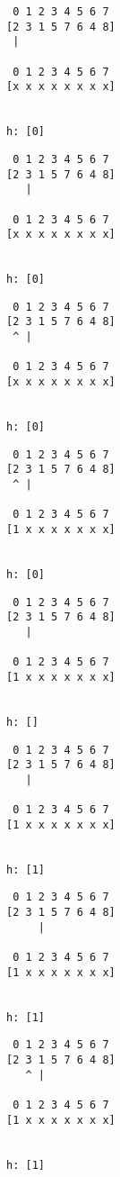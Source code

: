 { \begin{verbatim}
 0 1 2 3 4 5 6 7
[2 3 1 5 7 6 4 8]
 |

 0 1 2 3 4 5 6 7
[x x x x x x x x]


h: [0]
\end{verbatim} }

{ \begin{verbatim}
 0 1 2 3 4 5 6 7
[2 3 1 5 7 6 4 8]
   |

 0 1 2 3 4 5 6 7
[x x x x x x x x]


h: [0]
\end{verbatim} }

{ \begin{verbatim}
 0 1 2 3 4 5 6 7
[2 3 1 5 7 6 4 8]
 ^ |

 0 1 2 3 4 5 6 7
[x x x x x x x x]


h: [0]
\end{verbatim} }

{ \begin{verbatim}
 0 1 2 3 4 5 6 7
[2 3 1 5 7 6 4 8]
 ^ |

 0 1 2 3 4 5 6 7
[1 x x x x x x x]


h: [0]
\end{verbatim} }

{ \begin{verbatim}
 0 1 2 3 4 5 6 7
[2 3 1 5 7 6 4 8]
   |

 0 1 2 3 4 5 6 7
[1 x x x x x x x]


h: []
\end{verbatim} }

{ \begin{verbatim}
 0 1 2 3 4 5 6 7
[2 3 1 5 7 6 4 8]
   |

 0 1 2 3 4 5 6 7
[1 x x x x x x x]


h: [1]
\end{verbatim} }

{ \begin{verbatim}
 0 1 2 3 4 5 6 7
[2 3 1 5 7 6 4 8]
     |

 0 1 2 3 4 5 6 7
[1 x x x x x x x]


h: [1]
\end{verbatim} }

{ \begin{verbatim}
 0 1 2 3 4 5 6 7
[2 3 1 5 7 6 4 8]
   ^ |

 0 1 2 3 4 5 6 7
[1 x x x x x x x]


h: [1]
\end{verbatim} }

